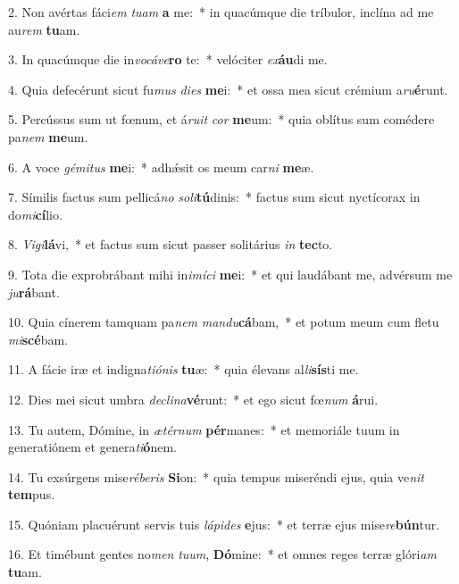 2. Non avértas fáci\textit{em} \textit{tu}\textit{am} \textbf{a} me:~*  in quacúmque die tríbulor, inclína ad me au\textit{rem} \textbf{tu}am.\

3. In quacúmque die in\textit{vo}\textit{cá}\textit{ve}\textbf{ro} te:~*  velóciter \textit{ex}\textbf{áu}di me.\

4. Quia defecérunt sicut fu\textit{mus} \textit{di}\textit{es} \textbf{me}i:~*  et ossa mea sicut crémium a\textit{ru}\textbf{é}runt.\

5. Percússus sum ut fœnum, et á\textit{ru}\textit{it} \textit{cor} \textbf{me}um:~*  quia oblítus sum comédere pa\textit{nem} \textbf{me}um.\

6. A voce \textit{gé}\textit{mi}\textit{tus} \textbf{me}i:~*  adhǽsit os meum car\textit{ni} \textbf{me}æ.\

7. Símilis factus sum pellicá\textit{no} \textit{so}\textit{li}\textbf{tú}dinis:~*  factus sum sicut nyctícorax in do\textit{mi}\textbf{cí}lio.\

8. \textit{Vi}\textit{gi}\textbf{lá}vi,~*  et factus sum sicut passer solitárius \textit{in} \textbf{tec}to.\

9. Tota die exprobrábant mihi in\textit{i}\textit{mí}\textit{ci} \textbf{me}i:~*  et qui laudábant me, advérsum me \textit{ju}\textbf{rá}bant.\

10. Quia cínerem tamquam pa\textit{nem} \textit{man}\textit{du}\textbf{cá}bam,~*  et potum meum cum fletu \textit{mi}\textbf{scé}bam.\

11. A fácie iræ et indigna\textit{ti}\textit{ó}\textit{nis} \textbf{tu}æ:~*  quia élevans al\textit{li}\textbf{sís}ti me.\

12. Dies mei sicut umbra \textit{de}\textit{cli}\textit{na}\textbf{vé}runt:~*  et ego sicut fœ\textit{num} \textbf{á}rui.\

13. Tu autem, Dómine, in \textit{æ}\textit{tér}\textit{num} \textbf{pér}manes:~*  et memoriále tuum in generatiónem et genera\textit{ti}\textbf{ó}nem.\

14. Tu exsúrgens mise\textit{ré}\textit{be}\textit{ris} \textbf{Si}on:~*  quia tempus miseréndi ejus, quia ve\textit{nit} \textbf{tem}pus.\

15. Quóniam placuérunt servis tuis \textit{lá}\textit{pi}\textit{des} \textbf{e}jus:~*  et terræ ejus mise\textit{re}\textbf{bún}tur.\

16. Et timébunt gentes no\textit{men} \textit{tu}\textit{um}, \textbf{Dó}mine:~*  et omnes reges terræ glóri\textit{am} \textbf{tu}am.\

